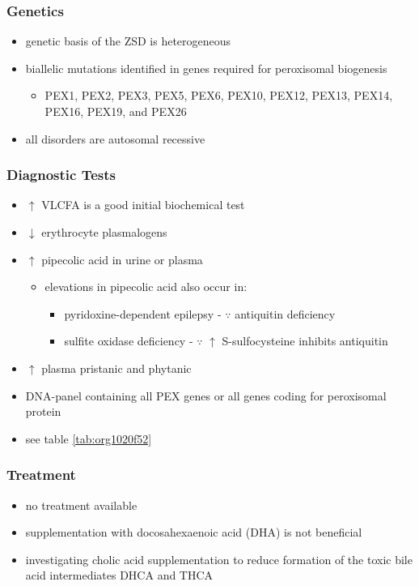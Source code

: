 \documentclass[12pt]{scrartcl}
\begin{document}
\subsubsection{Genetics}
\label{sec:orgdd0960c}
\begin{itemize}
\item genetic basis of the ZSD is heterogeneous
\item biallelic mutations identified in genes required for peroxisomal biogenesis
\begin{itemize}
\item PEX1, PEX2, PEX3, PEX5, PEX6, PEX10, PEX12, PEX13, PEX14, PEX16, PEX19, and PEX26
\end{itemize}
\item all disorders are autosomal recessive
\end{itemize}

\subsubsection{Diagnostic Tests}
\label{sec:org082d365}
\begin{itemize}
\item \(\uparrow\) VLCFA is a good initial biochemical test
\item \(\downarrow\) erythrocyte plasmalogens
\item \(\uparrow\) pipecolic acid in urine or plasma
\begin{itemize}
\item elevations in pipecolic acid also occur in:
\begin{itemize}
\item pyridoxine-dependent epilepsy - \(\because\) antiquitin deficiency
\item sulfite oxidase deficiency - \(\because\) \(\uparrow\) S-sulfocysteine inhibits antiquitin
\end{itemize}
\end{itemize}
\item \(\uparrow\) plasma pristanic and phytanic
\item DNA-panel containing all PEX genes or all genes coding for
peroxisomal protein
\item see table \ref{tab:org1020f52}
\end{itemize}
\subsubsection{Treatment}
\label{sec:org28ee4e5}
\begin{itemize}
\item no treatment available
\item supplementation with docosahexaenoic acid (DHA) is not beneficial
\item investigating cholic acid supplementation to reduce formation of the
toxic bile acid intermediates DHCA and THCA
\end{itemize}
\end{document}
